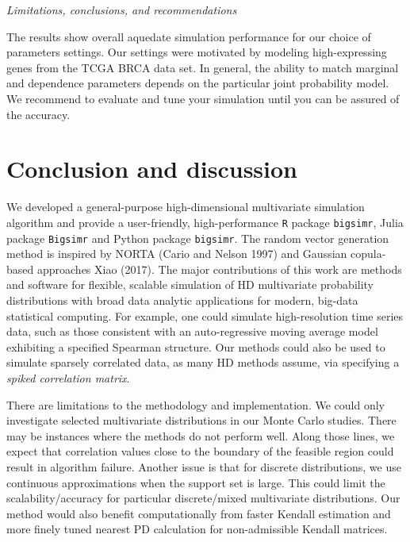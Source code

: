 \documentclass{article}
\begin{document}
\emph{Limitations, conclusions, and recommendations}

The results show overall aquedate simulation performance for our choice
of parameters settings. Our settings were motivated by modeling
high-expressing genes from the TCGA BRCA data set. In general, the
ability to match marginal and dependence parameters depends on the
particular joint probability model. We recommend to evaluate and tune
your simulation until you can be assured of the accuracy.

\hypertarget{discussion}{%
\section{Conclusion and discussion}\label{discussion}}

We developed a general-purpose high-dimensional multivariate simulation
algorithm and provide a user-friendly, high-performance \texttt{R}
package \texttt{bigsimr}, Julia package \texttt{Bigsimr} and Python
package \texttt{bigsimr}. The random vector generation method is
inspired by NORTA (Cario and Nelson 1997) and Gaussian copula-based
approaches Xiao (2017). The major contributions of this work are methods
and software for flexible, scalable simulation of HD multivariate
probability distributions with broad data analytic applications for
modern, big-data statistical computing. For example, one could simulate
high-resolution time series data, such as those consistent with an
auto-regressive moving average model exhibiting a specified Spearman
structure. Our methods could also be used to simulate sparsely
correlated data, as many HD methods assume, via specifying a
\emph{spiked correlation matrix}.

There are limitations to the methodology and implementation. We could
only investigate selected multivariate distributions in our Monte Carlo
studies. There may be instances where the methods do not perform well.
Along those lines, we expect that correlation values close to the
boundary of the feasible region could result in algorithm failure.
Another issue is that for discrete distributions, we use continuous
approximations when the support set is large. This could limit the
scalability/accuracy for particular discrete/mixed multivariate
distributions. Our method would also benefit computationally from faster
Kendall estimation and more finely tuned nearest PD calculation for
non-admissible Kendall matrices.
\end{document}
